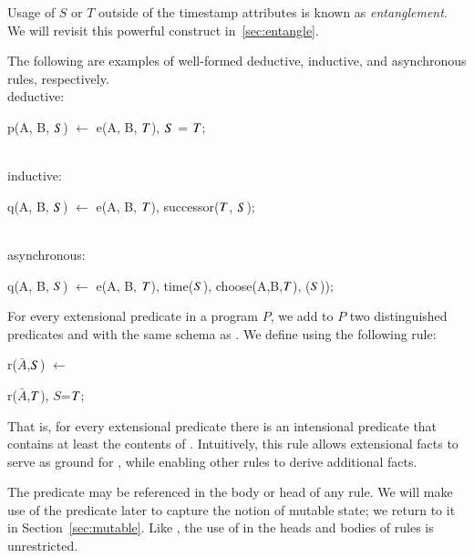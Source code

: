 Usage of $S$ or $T$ outside of the timestamp attributes is known as {\em entanglement}.  We will revisit this powerful construct in~\ref{sec:entangle}. 

\begin{example}
The following are examples of well-formed deductive, inductive, and asynchronous rules, respectively.
\\
deductive:
\begin{Dedalus}
p(A, B, \(\DS\)) \(\leftarrow\) e(A, B, \(\DT\)), \(\DS\) = \(\DT\);
\end{Dedalus}
\\
inductive:
\begin{Dedalus}
q(A, B, \(\DS\)) \(\leftarrow\) e(A, B, \(\DT\)), successor(\(\DT\), \(\DS\));
\end{Dedalus}
\\
asynchronous:
\begin{Dedalus}
q(A, B, \(\DS\)) \(\leftarrow\) e(A, B, \(\DT\)), time(\(\DS\)), choose(A,B,\(\DT\)), (\(\DS\)));
\end{Dedalus}
\end{example}

For every extensional predicate  in a \lang program $P$, we add to
$P$ two distinguished predicates  and  with the same schema
as .  We define  using the following rule:

\begin{dedalus}
r\pos($\bar{A}$,\(\DS\)) \(\leftarrow\)
\end{dedalus}

\hspace{5mm}
\begin{dedalus}
   r($\bar{A}$,\(\DT\)), \(S\)=\(\DT\);
\end{dedalus}

That is, for every extensional predicate  there is an intensional
predicate  that contains at least the contents of .
Intuitively, this rule allows extensional facts to serve as ground for
, while enabling other rules to derive additional  facts.

The predicate  may be referenced in the body or head of any \lang rule.  
We will make use of the predicate  later to capture the notion of mutable state; we return to it in Section~\ref{sec:mutable}. 
Like , the use of  in the heads and bodies of rules is unrestricted.

